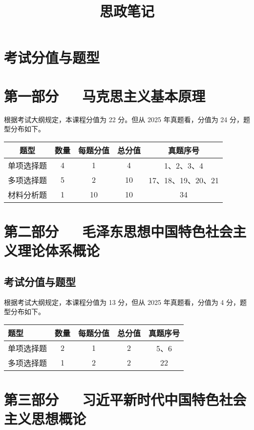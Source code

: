 \documentclass[UTF8]{ctexart}
\title{思政笔记}
\author{}
\date{}
\begin{document}
	\maketitle
	
	\section{考试分值与题型}
	\section*{\colorbox{green!50}{第一部分~~~\hfill 马克思主义基本原理}}
	根据考试大纲规定，本课程分值为 22 分。但从 2025 年真题看，分值为 24 分，题型分布如下。
	\begin{table}[h]
		\centering
		\begin{tabular}{ccccc}
			\toprule
			题型 & 数量 & 每题分值 & 总分值 & 真题序号 \\
			\midrule
			单项选择题 & 4 & 1 & 4 & 1、2、3、4 \\
			多项选择题 & 5 & 2 & 10 & 17、18、19、20、21 \\
			材料分析题 & 1 & 10 & 10 & 34 \\
			\bottomrule
		\end{tabular}
	\end{table}
	
	\section*{\colorbox{green!50}{第二部分~~~\hfill 毛泽东思想中国特色社会主义理论体系概论}}
	
	\subsection*{考试分值与题型}
	根据考试大纲规定，本课程分值为 13 分，但从 2025 年真题看，分值为 4 分，题型分布如下。
	\begin{table}[h]
		\centering
		\begin{tabular}{lcccc}
			\toprule
			题型 & 数量 & 每题分值 & 总分值 & 真题序号 \\
			\midrule
			单项选择题 & 2 & 1 & 2 & 5、6 \\
			多项选择题 & 1 & 2 & 2 & 22 \\
			\bottomrule
		\end{tabular}
	\end{table}
	
	\section*{\colorbox{green!50}{第三部分~~~\hfill 习近平新时代中国特色社会主义思想概论}}
	
\end{document}
